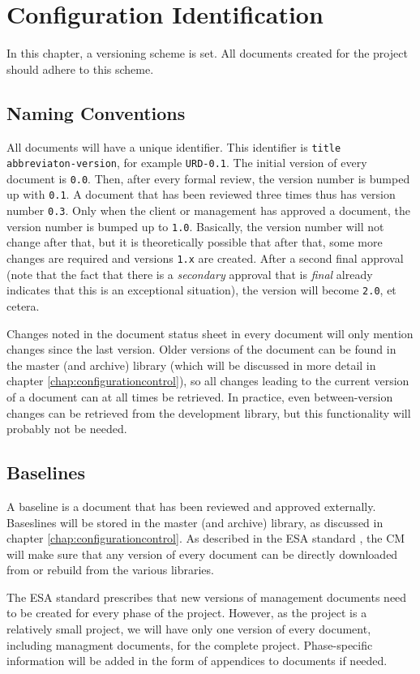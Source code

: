 \chapter{Configuration Identification}
\label{chap:configurationidentification}
In this chapter, a versioning scheme is set. All documents created for the \projectname{} project should adhere to this scheme.

\section{Naming Conventions}
All documents will have a unique identifier. This identifier is \texttt{title abbreviaton-version}, for example \texttt{URD-0.1}. The initial version of every document is \texttt{0.0}. Then, after every formal review, the version number is bumped up with \texttt{0.1}. A document that has been reviewed three times thus has version number \texttt{0.3}. Only when the client or management has approved a document, the version number is bumped up to \texttt{1.0}. Basically, the version number will not change after that, but it is theoretically possible that after that, some more changes are required and versions \texttt{1.x} are created. After a second final approval (note that the fact that there is a \emph{secondary} approval that is \emph{final} already indicates that this is an exceptional situation), the version will become \texttt{2.0}, et cetera.

Changes noted in the document status sheet in every document will only mention changes since the last version. Older versions of the document can be found in the master (and archive) library (which will be discussed in more detail in chapter \ref{chap:configurationcontrol}), so all changes leading to the current version of a document can at all times be retrieved. In practice, even between-version changes can be retrieved from the development library, but this functionality will probably not be needed.

\section{Baselines}
A baseline is a document that has been reviewed and approved externally. Baseslines will be stored in the master (and archive) library, as discussed in chapter \ref{chap:configurationcontrol}. As described in the ESA standard \cite{esa}, the CM will make sure that any version of every document can be directly downloaded from or rebuild from the various libraries.

The ESA standard prescribes that new versions of management documents need to be created for every phase of the project. However, as the \projectname{} project is a relatively small project, we will have only one version of every document, including managment documents, for the complete project. Phase-specific information will be added in the form of appendices to documents if needed.